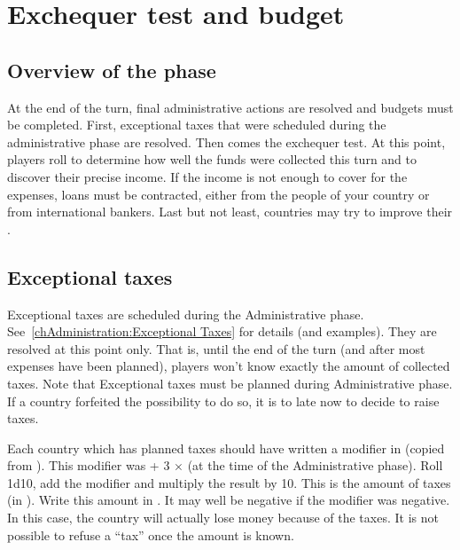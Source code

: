 
\chapter{Exchequer test and budget}\label{chapter:Budget}

\section{Overview of the phase}

\aparag[Administration] At the end of the turn, final administrative actions
are resolved and budgets must be completed. First, exceptional taxes that were
scheduled during the administrative phase are resolved. Then comes the
exchequer test. At this point, players roll to determine how well the funds
were collected this turn and to discover their precise income. If the income
is not enough to cover for the expenses, loans must be contracted, either from
the people of your country or from international bankers. Last but not least,
countries may try to improve their \STAB.

\aparag[Sequence.]
\ExchequerDetails

\section{Exceptional taxes}\label{chBudget:Exceptional taxes}
 Exceptional taxes are scheduled during the
Administrative phase. See~\ref{chAdministration:Exceptional Taxes} for details
(and examples). They are resolved at this point only. That is, until the end
of the turn (and after most expenses have been planned), players won't know
exactly the amount of collected taxes.
\bparag Note that Exceptional taxes must be planned during Administrative
phase. If a country forfeited the possibility to do so, it is to late now to
decide to raise taxes.

\bparag Each country which has planned taxes should have written a modifier in
 (copied from
). This modifier was \ADM + 3
$\times$ \STAB (at the time of the Administrative phase).
\bparag Roll 1d10, add the modifier and multiply the result by 10. This is the
amount of taxes (in \ducats).
\bparag Write this amount in . It may well be
negative if the modifier was negative. In this case, the country will actually
lose money because of the taxes. It is not possible to refuse a ``tax'' once
the amount is known.

